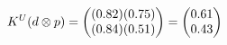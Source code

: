 \documentclass[preview]{standalone}
\begin{document}
\begin{align*}
\special{dvisvgm:raw <g id='unique000'>}K^U(d \otimes p) = \begin{pmatrix} (0.82)(0.75) \\ (0.84)(0.51) \end{pmatrix} = \begin{pmatrix} 0.61 \\ 0.43 \end{pmatrix}\special{dvisvgm:raw </g>}
\end{align*}
\end{document}
